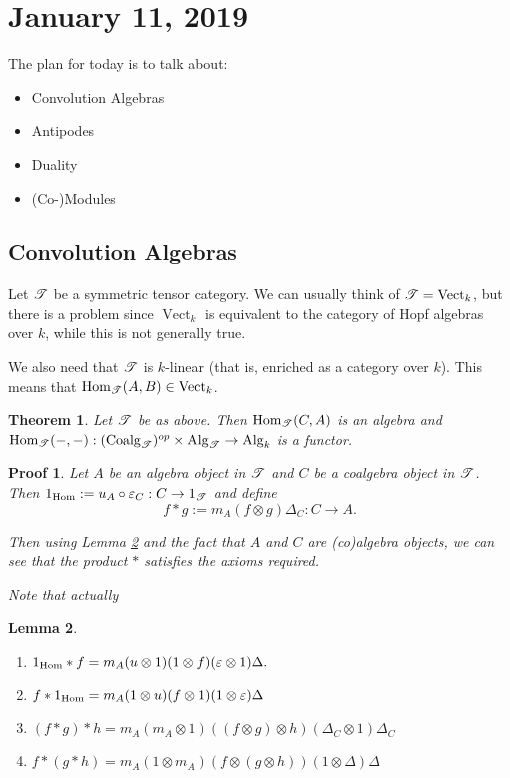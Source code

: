 \documentclass[12pt]{article}
\theoremstyle{break}
\theoremstyle{nonumberbreak}
\theoremstyle{changebreak}
\newtheorem{thm}{Theorem}[subsection]
\newtheorem{lem}[thm]{Lemma}
\theoremstyle{break}
\theoremstyle{nonumberbreak}
\newtheorem{prf}{Proof}
\theoremstyle{nonumberplain}
\theoremstyle{change}
\newcommand*{\Hom}{\ensuremath\text{Hom}}
\newcommand*{\Vectk}{\operatorname{Vect}_k}
\DeclareMathOperator{\Coalg}{Coalg}
\DeclareMathOperator{\Alg}{Alg}
\newcommand*{\scrT}{\ensuremath\mathscr{T}}
\begin{document}
\section{January 11, 2019}
The plan for today is to talk about:
\begin{itemize}
	\item Convolution Algebras
	\item Antipodes
	\item Duality
	\item (Co-)Modules
\end{itemize}

\subsection{Convolution Algebras}
 Let $\scrT$ be a symmetric tensor category. We can usually think of $\scrT=\Vectk$, but 
 there is a problem since $\Vectk$ is equivalent to the category of Hopf algebras over $k$,
 while this is not generally true.

 We also need that $\scrT$ is $k$-linear (that is, enriched as a category over $k$). This
 means that $\Hom_\scrT (A,B)\in\Vectk$.

 \begin{thm}
	Let $\scrT$ be as above. Then $\Hom_\scrT(C,A)$ is an algebra and $\Hom_\scrT(-,-):(\Coalg_\scrT)^{op}\times\Alg_\scrT\to\Alg_k$
	is a functor.
 \end{thm}
 \begin{prf}
	Let $A$ be an algebra object in $\scrT$ and $C$ be a coalgebra object in $\scrT$. Then $1_{\Hom} :=u_A\circ\varepsilon_C:C\to 1_\scrT$ and define
	\[f\ast g := m_A(f\otimes g)\Delta_C:C\to A.\]

	Then using Lemma \ref{lem-func} and the fact that $A$ and $C$ are (co)algebra objects,
	we can see that the product $\ast$ satisfies the axioms required.

	Note that actually
 \end{prf}
 \begin{lem}
	\begin{enumerate}
		\item $1_{\Hom}\ast f = m_A(u\otimes 1)(1\otimes f)(\varepsilon\otimes 1)\Delta.$
		\item $f\ast 1_{\Hom}=m_A(1\otimes u)(f\otimes 1)(1\otimes \varepsilon)\Delta$
		\item $(f\ast g)\ast h=m_A(m_A\otimes 1)((f\otimes g)\otimes h)(\Delta_C\otimes 1)\Delta_C$
		\item $f\ast(g\ast h)=m_A(1\otimes m_A)(f\otimes(g\otimes h))(1\otimes \Delta)\Delta$
	\end{enumerate}
	\label{lem-func}
 \end{lem}
 
\end{document}
